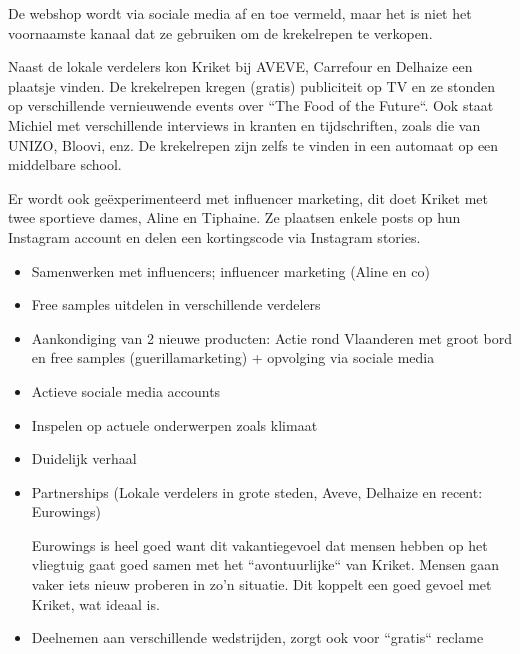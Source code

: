 De webshop wordt via sociale media af en toe vermeld, maar het is niet het voornaamste kanaal dat ze gebruiken om de krekelrepen te verkopen.

Naast de lokale verdelers kon Kriket bij AVEVE, Carrefour en Delhaize een plaatsje vinden. De krekelrepen kregen (gratis) publiciteit op TV en ze stonden op verschillende vernieuwende events over ``The Food of the Future``. Ook staat Michiel met verschillende interviews in kranten en tijdschriften, zoals die van UNIZO, Bloovi, enz. De krekelrepen zijn zelfs te vinden in een automaat op een middelbare school.

Er wordt ook geëxperimenteerd met influencer marketing, dit doet Kriket met twee sportieve dames, Aline en Tiphaine. Ze plaatsen enkele posts op hun Instagram account en delen een kortingscode via Instagram stories.

\begin{itemize} 
	\item Samenwerken met influencers; influencer marketing (Aline en co)
	\item Free samples uitdelen in verschillende verdelers
	\item Aankondiging van 2 nieuwe producten: Actie rond Vlaanderen met groot bord en free samples (guerillamarketing) + opvolging via sociale media
	\item Actieve sociale media accounts
	\item Inspelen op actuele onderwerpen zoals klimaat
	\item Duidelijk verhaal
	\item Partnerships (Lokale verdelers in grote steden, Aveve, Delhaize en recent: Eurowings)
	
	Eurowings is heel goed want dit vakantiegevoel dat mensen hebben op het vliegtuig gaat goed samen met het ``avontuurlijke`` van Kriket. Mensen gaan vaker iets nieuw proberen in zo'n situatie. Dit koppelt een goed gevoel met Kriket, wat ideaal is.
	
	\item Deelnemen aan verschillende wedstrijden, zorgt ook voor ``gratis`` reclame
\end{itemize}